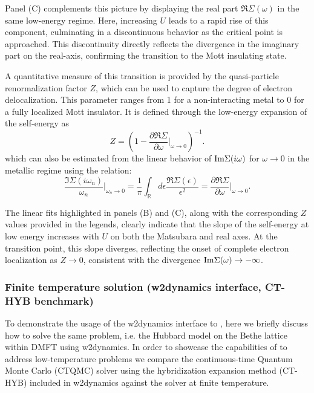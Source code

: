 \documentclass[edipack_sp.tex]{subfiles}
\begin{document}
Panel (C) complements this picture by displaying the real part 
$\Re{\Sigma}(\omega)$ in the same low-energy regime. Here, increasing 
$U$ leads to a rapid rise of this component, culminating in a 
discontinuous behavior as the critical point is approached. This 
discontinuity directly reflects the divergence in the imaginary part
on the real-axis,  confirming the transition to the Mott insulating state.


A quantitative measure of this transition is provided by the 
quasi-particle renormalization factor $Z$, which can be used to capture the degree 
of electron delocalization. This parameter ranges from 1 for a 
non-interacting metal to 0 for a fully localized Mott insulator. It is 
defined through the low-energy expansion of the self-energy as
$$
Z=\left(1-\frac{\partial\Re\Sigma}{\partial\omega}\Biggr|_{\omega\rightarrow
    0}\right)^{-1}.
$$
which can also be estimated from the linear behavior of ${\rm Im}\Sigma(i\omega)$ for 
$\omega\to0$ in the metallic regime using the relation:
$$
   \frac{\Im\Sigma(i\omega_n)}{\omega_n}\Biggr|_{\omega_n\rightarrow 0}=
   \frac{1}{\pi}\int_{\mathbb R}d\epsilon \frac{\Re\Sigma(\epsilon)}{\epsilon^2}=
   \frac{\partial\Re\Sigma}{\partial\omega}\Biggr|_{\omega\rightarrow 0}.
$$

The linear fits highlighted in panels (B) and (C), along with the 
corresponding $Z$ values provided in the legends, clearly indicate that 
the slope of the self-energy at low energy increases with $U$ on both 
the Matsubara and real axes. At the transition point, this slope 
diverges, reflecting the onset of complete electron localization as 
$Z \to 0$, consistent with the divergence 
${\rm Im}\Sigma(\omega) \rightarrow -\infty$.






\subsubsection{Finite temperature solution (w2dynamics interface, CT-HYB benchmark)}\label{SecExamplesBetheDMFTw2d}
To demonstrate the usage of the w2dynamics interface to \NAME,  here we briefly discuss how to solve the same problem, i.e. the Hubbard model on the Bethe lattice within DMFT using w2dynamics. 
In order to showcase the capabilities of \NAME to address low-temperature problems we compare the continuous-time Quantum Monte Carlo (CTQMC) solver using the hybridization expansion method (CT-HYB) included in w2dynamics against the \NAME solver at finite temperature.  
\end{document}
